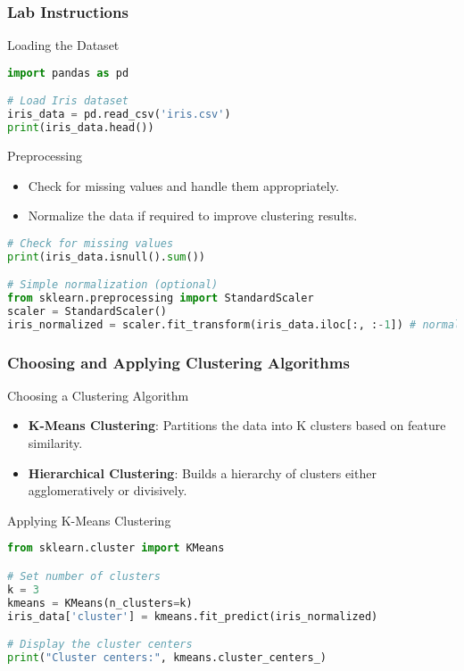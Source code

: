 \documentclass[aspectratio=169]{beamer}
\begin{document}
\begin{frame}[fragile]
    \frametitle{Lab Instructions}
    \begin{block}{Loading the Dataset}
        \begin{lstlisting}[language=Python]
import pandas as pd

# Load Iris dataset
iris_data = pd.read_csv('iris.csv')
print(iris_data.head())
        \end{lstlisting}
    \end{block}

    \begin{block}{Preprocessing}
        \begin{itemize}
            \item Check for missing values and handle them appropriately.
            \item Normalize the data if required to improve clustering results.
        \end{itemize}
        \begin{lstlisting}[language=Python]
# Check for missing values
print(iris_data.isnull().sum())

# Simple normalization (optional)
from sklearn.preprocessing import StandardScaler
scaler = StandardScaler()
iris_normalized = scaler.fit_transform(iris_data.iloc[:, :-1]) # normalize features
        \end{lstlisting}
    \end{block}
\end{frame}

\begin{frame}[fragile]
    \frametitle{Choosing and Applying Clustering Algorithms}
    \begin{block}{Choosing a Clustering Algorithm}
        \begin{itemize}
            \item \textbf{K-Means Clustering}: Partitions the data into K clusters based on feature similarity.
            \item \textbf{Hierarchical Clustering}: Builds a hierarchy of clusters either agglomeratively or divisively.
        \end{itemize}
    \end{block}

    \begin{block}{Applying K-Means Clustering}
        \begin{lstlisting}[language=Python]
from sklearn.cluster import KMeans

# Set number of clusters
k = 3  
kmeans = KMeans(n_clusters=k)
iris_data['cluster'] = kmeans.fit_predict(iris_normalized)

# Display the cluster centers
print("Cluster centers:", kmeans.cluster_centers_)
        \end{lstlisting}
    \end{block}
\end{frame}
\end{document}
